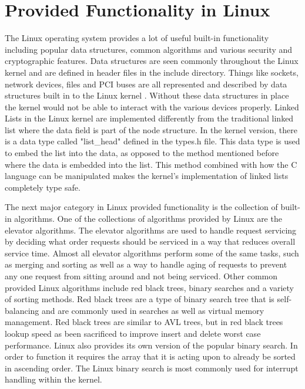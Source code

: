\documentclass[10pt,serif,draftclsnofoot,onecolumn]{IEEEtran}
\begin{document}
	\section{Provided Functionality in Linux}
	\par
			The Linux operating system provides a lot of useful built-in functionality including popular data structures, common algorithms and various security and cryptographic features\cite{2}. Data structures are seen commonly throughout the Linux kernel and are defined in header files in the include directory. Things like sockets, network devices, files and PCI buses are all represented and described by data structures built in to the Linux kernel \cite{1}. Without these data structures in place the kernel would not be able to interact with the various devices properly. Linked Lists in the Linux kernel are implemented differently from the traditional linked list where the data field is part of the node structure. In the kernel version, there is a data type called "list\_head" defined in the types.h file\cite{2}. This data type is used to embed the list into the data, as opposed to the method mentioned before where the data is embedded into the list. This method combined with how the C language can be manipulated makes the kernel's implementation of linked lists completely type safe.
	\newline
	\newline
	\par
			The next major category in Linux provided functionality is the collection of built-in algorithms. One of the collections of algorithms  provided by Linux are the elevator algorithms. The elevator algorithms are used to handle request servicing by deciding what order requests should be serviced in a way that reduces overall service time\cite{2}. Almost all elevator algorithms perform some of the same tasks, such as merging and sorting as well as a way to handle aging of requests to prevent any one request from sitting around and not being serviced\cite{2}. Other common provided Linux algorithms include red black trees, binary searches and a variety of sorting methods. Red black trees are a type of binary search tree that is self-balancing and are commonly used in searches as well as virtual memory management\cite{3}. Red black trees are similar to AVL trees, but in red black trees lookup speed as been sacrificed to improve insert and delete worst case performance\cite{3}. Linux also provides its own version of the popular binary search. In order to function it requires the array that it is acting upon to already be sorted in ascending order. The Linux binary search is most commonly used for interrupt handling within the kernel.
\end{document}

